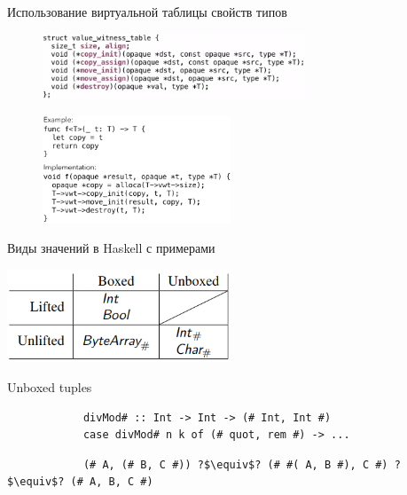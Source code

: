     \begin{frame}[fragile]{Использование виртуальной таблицы свойств типов}
        \begin{figure}
            \centering
            \includegraphics[width=0.7\textwidth]{figs/swift-witness-table}
        \end{figure}
        \begin{figure}
            \centering
            \includegraphics[width=0.5\textwidth]{figs/swift-generated-code}
        \end{figure}
    \end{frame}


    \begin{frame}[fragile]{Виды значений в Haskell с примерами}
        \pause
        \begin{center}
            \includegraphics[width=0.5\textwidth]{figs/haskell-value-kinds}
        \end{center}
    \end{frame}

    \begin{frame}[fragile]{Unboxed tuples}
         \pause
         \begin{verbatim}
            divMod# :: Int -> Int -> (# Int, Int #)
            case divMod# n k of (# quot, rem #) -> ...
         \end{verbatim}

        \pause\hspace{2em}
         \begin{verbatim}
            (# A, (# B, C #)) ?$\equiv$? (# #( A, B #), C #) ?$\equiv$? (# A, B, C #)
         \end{verbatim}
    \end{frame}

